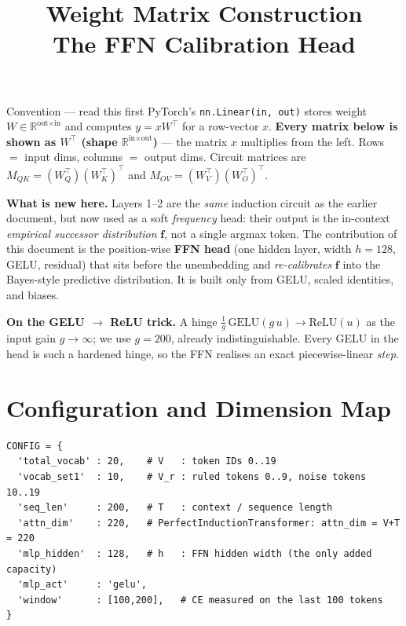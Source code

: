 \documentclass[11pt]{article}
\title{\textbf{Weight Matrix Construction\\[2pt]\large The FFN Calibration Head}}
\author{}
\date{}
\newcommand{\R}{\mathbb{R}}
\newcommand{\T}{^{\!\top}}
\newcommand{\fvec}{\mathbf{f}}
\begin{document}
\maketitle
\vspace{-3.2em}

\begin{convbox}{Convention --- read this first}
PyTorch's \texttt{nn.Linear(in,\,out)} stores weight $W\in\R^{\text{out}\times\text{in}}$ and
computes $y=xW\T$ for a row-vector $x$. \textbf{Every matrix below is shown as $W\T$
(shape $\R^{\text{in}\times\text{out}}$)} --- the matrix $x$ multiplies from the left.
Rows $=$ input dims, columns $=$ output dims. Circuit matrices are
$M_{QK}=(W_Q\T)(W_K\T)\T$ and $M_{OV}=(W_V\T)(W_O\T)\T$.

\smallskip
\textbf{What is new here.} Layers 1--2 are the \emph{same} induction circuit as the earlier
document, but now used as a soft \emph{frequency} head: their output is the in-context
\emph{empirical successor distribution} $\fvec$, not a single argmax token. The contribution of
this document is the position-wise \textbf{FFN head} (one hidden layer, width $h=128$, GELU,
residual) that sits before the unembedding and \emph{re-calibrates} $\fvec$ into the
Bayes-style predictive distribution. It is built only from GELU, scaled identities, and biases.

\smallskip
\textbf{On the GELU $\to$ ReLU trick.} A hinge $\tfrac{1}{g}\,\mathrm{GELU}(g\,u)\to\mathrm{ReLU}(u)$
as the input gain $g\to\infty$; we use $g=200$, already indistinguishable. Every GELU in the head
is such a hardened hinge, so the FFN realises an exact piecewise-linear \emph{step}.
\end{convbox}

\tableofcontents
\newpage

\section{Configuration and Dimension Map}
\begin{lstlisting}
CONFIG = {
  'total_vocab' : 20,    # V   : token IDs 0..19
  'vocab_set1'  : 10,    # V_r : ruled tokens 0..9, noise tokens 10..19
  'seq_len'     : 200,   # T   : context / sequence length
  'attn_dim'    : 220,   # PerfectInductionTransformer: attn_dim = V+T = 220
  'mlp_hidden'  : 128,   # h   : FFN hidden width (the only added capacity)
  'mlp_act'     : 'gelu',
  'window'      : [100,200],   # CE measured on the last 100 tokens
}
\end{lstlisting}
\end{document}
